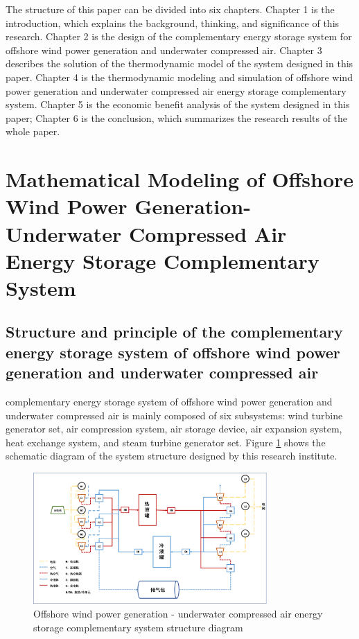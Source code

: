\documentclass[journal,onecolumn]{IEEEtran}
\begin{document}
The structure of this paper can be divided into six chapters. Chapter 1 is the introduction, which explains the background, thinking, and significance of this research. Chapter 2 is the design of the complementary energy storage system for offshore wind power generation and underwater compressed air. Chapter 3 describes the solution of the thermodynamic model of the system designed in this paper. Chapter 4 is the thermodynamic modeling and simulation of offshore wind power generation and underwater compressed air energy storage complementary system. Chapter 5 is the economic benefit analysis of the system designed in this paper; Chapter 6 is the conclusion, which summarizes the research results of the whole paper.



\section{Mathematical Modeling of Offshore Wind Power Generation-Underwater Compressed Air Energy Storage Complementary System}
\subsection{Structure and principle of the complementary energy storage system of offshore wind power generation and underwater compressed air}

 complementary energy storage system of offshore wind power generation and underwater compressed air is mainly composed of six subsystems: wind turbine generator set, air compression system, air storage device, air expansion system, heat exchange system, and steam turbine generator set. Figure \ref{general system} shows the schematic diagram of the system structure designed by this research institute.\\

\begin{figure}[h] %
	\centering %
	\includegraphics[width=0.8\textwidth]{pictures/screenshot001} %
	\caption{Offshore wind power generation - underwater compressed air energy storage complementary system structure diagram} %
	\label{general system} %
\end{figure}%
\end{document}
